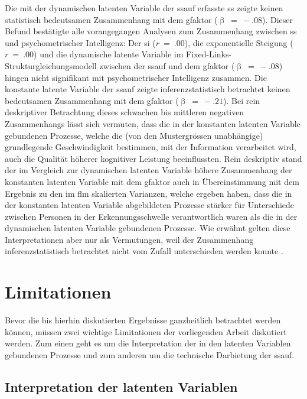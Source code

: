 \documentclass[11pt, twoside, a4paper]{book}		%
\begin{document}
Die mit der dynamischen latenten Variable der \gls{ssauf} erfasste \gls{ss} zeigte keinen statistisch bedeutsamen Zusammenhang mit dem \gls{gfaktor} ($\upbeta~=~-.08$). Dieser Befund bestätigte alle vorangegangen Analysen zum Zusammenhang zwischen \gls{ss} und psychometrischer Intelligenz: Der \gls{si} ($r~=~.00$), die exponentielle Steigung ($r~=~.00$) und die dynamische latente Variable im Fixed-Links-Struk\-tur\-glei\-chungs\-mo\-dell zwischen der \gls{ssauf} und dem \gls{gfaktor} ($\upbeta~=~-.08$) hingen nicht signifikant mit psychometrischer Intelligenz zusammen.
Die konstante latente Variable der \gls{ssauf} zeigte inferenzstatistisch betrachtet keinen bedeutsamen Zusammenhang mit dem \gls{gfaktor} ($\upbeta~=~-.21$). Bei rein deskriptiver Betrachtung dieses schwachen bis mittleren negativen Zusammenhangs lässt sich vermuten, dass die in der konstanten latenten Variable gebundenen Prozesse, welche die  (von den Mustergrössen unabhängige) grundlegende Geschwindigkeit bestimmen, mit der Information verarbeitet wird, auch die Qualität höherer kognitiver Leistung beeinflussten.
Rein deskriptiv stand der im Vergleich zur dynamischen latenten Variable höhere Zusammenhang der konstanten latenten Variable mit dem \gls{gfaktor} auch in Übereinstimmung mit dem Ergebnis zu den im \gls{flm} skalierten Varianzen, welche ergeben haben, dass die in der konstanten latenten Variable abgebildeten Prozesse stärker für Unterschiede zwischen Personen in der Erkennungsschwelle verantwortlich waren als die in der dynamischen latenten Variable gebundenen Prozesse. Wie erwähnt gelten diese Interpretationen aber nur als Vermutungen, weil der Zusammenhang inferenzstatistisch betrachtet nicht vom Zufall unterschieden werden konnte \citep[für eine statistische Rechtfertigung dieser Vorgehensweise siehe][]{Gelman2006, Wasserstein2016}.

\section{Limitationen}

Bevor die bis hierhin diskutierten Ergebnisse ganzheitlich betrachtet werden können, müssen zwei wichtige Limitationen der vorliegenden Arbeit diskutiert werden. Zum einen geht es um die Interpretation der in den latenten Variablen gebundenen Prozesse und zum anderen um die technische Darbietung der \gls{ssauf}.

\subsection{Interpretation der latenten Variablen}
\end{document}
